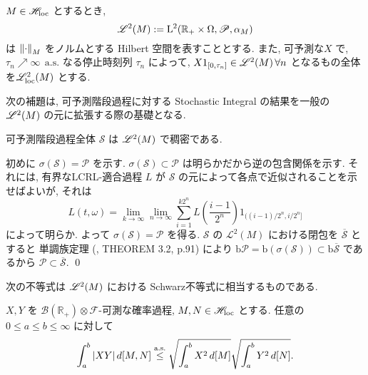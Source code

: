 \documentclass{ltjsarticle}
\begin{document}
\begin{dfn} \label{space LL and LLl}
	\( M \in \mathscr{H}_{\mathrm{loc}} \) とするとき,
	\[
		\mathscr{L}^2 (M) := \mathrm{L}^2( \mathbb{R}_{+} \times \Omega, \mathscr{P}, \alpha_M)
	\]
	は \( 
	\left\| \cdot  \right\|_{M} \) をノルムとする Hilbert 空間を表すこととする.
	また, 可予測な\( X \) で, \( \tau_n \nearrow \infty \ \ \mathrm{a.s.} \)
	なる停止時刻列 \( \tau_n \) によって, \( X 1_{[0,\tau_n]} \in \mathscr{L}^2 (M) \, \forall n \)
	となるもの全体を\( \mathscr{L}^2_{\mathrm{loc}}(M) \) とする.
	\fin\end{dfn}

次の補題は, 可予測階段過程に対する Stochastic Integral の結果を一般の \( \mathscr{L}^2 (M) \) の元に拡張する際の基礎となる.
\begin{lem}
	可予測階段過程全体 \( \mathscr{S} \) は \( \mathscr{L}^2 (M) \) で稠密である.
\end{lem}

\begin{prf}
	初めに \( \sigma \left( \mathscr{S} \right) = \mathscr{P} \) を示す.
	\( \sigma \left( \mathscr{S} \right) \subset \mathscr{P} \) は明らかだから逆の包含関係を示す.
	それには, 有界なLCRL-適合過程 \( L \) が \( \mathscr{S} \) の元によって各点で近似されることを示せばよいが, それは
	\[
		L(t,\omega) = \lim_{k \to \infty} \lim_{n \to \infty} \sum_{i=1}^{k2^n}
		L \left( \frac{i-1}{2^n} \right)1_{ ({(i-1)}/{2^n}, {i}/{2^n} ] }
	\]
	によって明らか. よって \( \sigma \left( \mathscr{S} \right) = \mathscr{P} \) を得る.
	\( \mathscr{S} \) の \( \mathscr{L}^2(M) \) における閉包を \( \overline{\mathscr{S}} \) とすると
	単調族定理 (\cite{Rogers-Williams:dmm1}, THEOREM 3.2, p.91) により
	\( \mathrm{b} \mathscr{P} = \mathrm{b} \left( \sigma \left( \mathscr{S} \right) \right)
	\subset \mathrm{b} \overline{\mathscr{S}} \) であるから
	\( \mathscr{P} \subset \overline{\mathscr{S}} \).
	\qed\end{prf}

次の不等式は \( \mathscr{L}^2 (M) \) における Schwarz不等式に相当するものである. 

\begin{thm}	%
	\( X, Y \) を \( \mathscr{B} (\mathbb{R}_{+}) \otimes \mathscr{F} \)-可測な確率過程,
	\( M,N \in \mathscr{H}_{\mathrm{loc}} \) とする. 任意の \( 0 \le a \le b \le \infty \) に対して
	\begin{equation}		\label{Kunita-Watanabe ineq}
		\int_a^b |XY| \, d[M,N] \stackrel{ \text{a.s.} }{ \le } \sqrt{ \int_a^b X^2\,d[M] }\sqrt{ \int_a^b Y^2\, d[N] }.
	\end{equation}
\end{thm}
\end{document}
